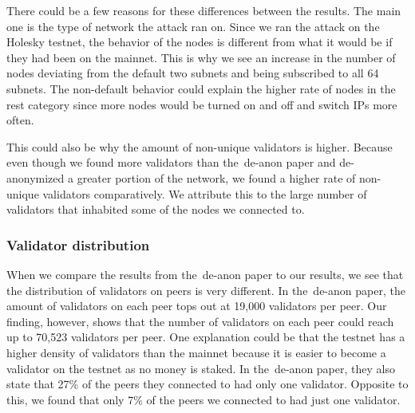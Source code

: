 There could be a few reasons for these differences between the results.
The main one is the type of network the attack ran on.
Since we ran the attack on the Holesky testnet, the behavior of the nodes is different from what it would be if they had been on the mainnet.
This is why we see an increase in the number of nodes deviating from the default two subnets and being subscribed to all 64 subnets.
The non-default behavior could explain the higher rate of nodes in the rest category since more nodes would be turned on and off and switch IPs more often.


This could also be why the amount of non-unique validators is higher.
Because even though we found more validators than the~\gls{de-anon paper} and de-anonymized a greater portion of the network, we found a higher rate of non-unique validators comparatively.
We attribute this to the large number of validators that inhabited some of the nodes we connected to.



\subsubsection{Validator distribution}\label{subsubsec:validator-distribution}
When we compare the results from the~\gls{de-anon paper} to our results, we see that the distribution of validators on peers is very different.
In the~\gls{de-anon paper}, the amount of validators on each peer tops out at 19,000 validators per peer.
Our finding, however, shows that the number of validators on each peer could reach up to 70,523 validators per peer.
One explanation could be that the testnet has a higher density of validators than the mainnet because it is easier to become a validator on the testnet as no money is staked.
In the~\gls{de-anon paper}, they also state that 27\% of the peers they connected to had only one validator.
Opposite to this, we found that only 7\% of the peers we connected to had just one validator.
